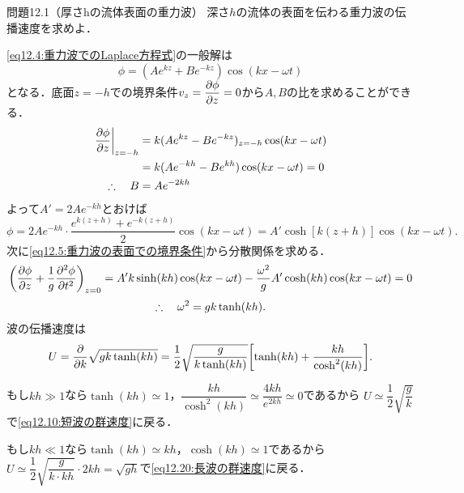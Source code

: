 
\begin{mondai}{}{問題12.1（厚さhの流体表面の重力波）}
深さ$h$の流体の表面を伝わる重力波の伝播速度を求めよ．
\end{mondai}
\begin{kaitou}
\eqref{eq12.4:重力波でのLaplace方程式}の一般解は
\[
    \phi = (Ae^{kz}+Be^{-kz}) \cos(kx-\omega t)
\]
となる．底面$z=-h$での境界条件$v_z=\dpdv{\phi}{z}=0$から$A,B$の比を求めることができる．
\begin{align*}
    \eval{\pdv{\phi}{z}}_{z=-h} &= k(Ae^{kz}-Be^{-kz})_{z=-h} \cos(kx-\omega t) \\
    &= k(Ae^{-kh}-Be^{kh}) \cos(kx-\omega t) = 0 \\
    \yueni B &= A e^{-2kh}
\end{align*}
よって$A'=2Ae^{-kh}$とおけば
\[
    \phi = 2Ae^{-kh} \cdot \frac{e^{k(z+h)}+e^{-k(z+h)}}{2} \cos(kx-\omega t)
    = A' \cosh[k(z+h)] \cos(kx-\omega t) .
\]
次に\eqref{eq12.5:重力波の表面での境界条件}から分散関係を求める．
\[
    \pqty{ \pdv{\phi}{z} + \frac{1}{g} \pdv[2]{\phi}{t} }_{z=0} 
    = A'k \sinh(kh)\cos(kx-\omega t) -\frac{\omega^2}{g}A'\cosh(kh)\cos(kx-\omega t) = 0
\]
\[
    \therefore\quad \omega^2 = gk \tanh(kh) .
\]
波の伝播速度は
\[
    U = \pdv{k} \sqrt{gk \tanh(kh)}
    = \frac{1}{2} \sqrt{\frac{g}{k\tanh(kh)}} \bqty{ \tanh(kh) + \frac{kh}{\cosh^2(kh)} } .
\]

もし$kh\gg 1$なら$\tanh(kh)\simeq 1$，$\dfrac{kh}{\cosh^2(kh)} \simeq \dfrac{4kh}{e^{2kh}}\simeq 0$であるから
$U \simeq \dfrac{1}{2} \sqrt{\dfrac{g}{k}}$で\eqref{eq12.10:短波の群速度}に戻る．

もし$kh\ll 1$なら$\tanh(kh)\simeq kh$，$\cosh(kh)\simeq 1$であるから
$U \simeq \dfrac{1}{2} \sqrt{\dfrac{g}{k\cdot kh}} \cdot 2kh = \sqrt{gh}$で\eqref{eq12.20:長波の群速度}に戻る．


\end{kaitou}





